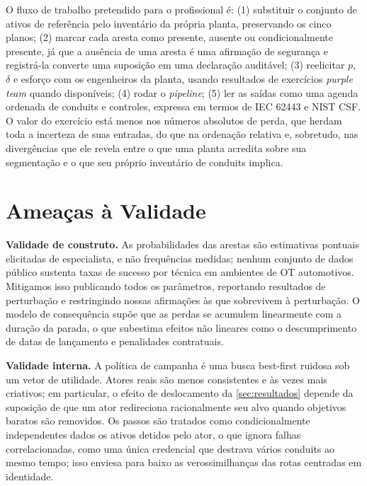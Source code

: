 O fluxo de trabalho pretendido para o profissional é: (1) substituir o conjunto
de ativos de referência pelo inventário da própria planta, preservando os cinco
planos; (2) marcar cada aresta como presente, ausente ou condicionalmente presente, já que a ausência de uma aresta é uma afirmação
de segurança e registrá-la converte uma suposição em uma declaração auditável; (3) reelicitar
$p$, $\delta$ e esforço com os engenheiros da planta, usando resultados de
exercícios \emph{purple team} quando disponíveis; (4) rodar o \emph{pipeline};
(5) ler as saídas como uma agenda ordenada de conduits e controles, expressa em
termos de IEC 62443 e NIST CSF. O valor do exercício está menos nos números absolutos de perda, que herdam toda a incerteza de suas
entradas, do que na ordenação relativa e, sobretudo, nas divergências que ele revela entre o que
uma planta acredita sobre sua segmentação e o que seu próprio inventário de
conduits implica.

\section{Ameaças à Validade}
\label{sec:validade}

\textbf{Validade de construto.} As probabilidades das arestas são estimativas
pontuais elicitadas de especialista, e não frequências medidas; nenhum conjunto
de dados público sustenta taxas de sucesso por técnica em ambientes de OT
automotivos. Mitigamos isso publicando todos os parâmetros, reportando
resultados de perturbação e restringindo nossas afirmações às que sobrevivem à
perturbação. O modelo de consequência supõe que as perdas se acumulem
linearmente com a duração da parada, o que subestima efeitos não lineares como
o descumprimento de datas de lançamento e penalidades contratuais.

\textbf{Validade interna.} A política de campanha é uma busca best-first
ruidosa sob um vetor de utilidade. Atores reais são menos consistentes e às
vezes mais criativos; em particular, o efeito de deslocamento da
\cref{sec:resultados} depende da suposição de que um ator redireciona
racionalmente seu alvo quando objetivos baratos são removidos. Os passos são
tratados como condicionalmente independentes dados os ativos detidos pelo ator,
o que ignora falhas correlacionadas, como uma única credencial que destrava
vários conduits ao mesmo tempo; isso enviesa para baixo as verossimilhanças das
rotas centradas em identidade.

